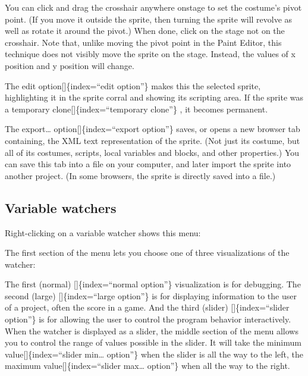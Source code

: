\documentclass[
  letterpaper,
]{book}
\begin{document}
You can click and drag the crosshair anywhere onstage to set the
costume's pivot point. (If you move it outside the sprite, then turning
the sprite will revolve as well as rotate it around the pivot.) When
done, click on the stage not on the crosshair. Note that, unlike moving
the pivot point in the Paint Editor, this technique does not visibly
move the sprite on the stage. Instead, the values of x position and y
position will change.

The edit option{[}{]}\{index=``edit option''\} makes this the selected
sprite, highlighting it in the sprite corral and showing its scripting
area. If the sprite was a temporary clone{[}{]}\{index=``temporary
clone''\} , it becomes permanent.

The export\ldots{} option{[}{]}\{index=``export option''\} saves, or
opens a new browser tab containing, the XML text representation of the
sprite. (Not just its costume, but all of its costumes, scripts, local
variables and blocks, and other properties.) You can save this tab into
a file on your computer, and later import the sprite into another
project. (In some browsers, the sprite is directly saved into a file.)

\subsection{Variable watchers}\label{variable-watchers}

Right-clicking on a variable watcher shows this menu:

The first section of the menu lets you choose one of three
visualizations of the watcher:

The first (normal) {[}{]}\{index=``normal option''\} visualization is
for debugging. The second (large) {[}{]}\{index=``large option''\} is
for displaying information to the user of a project, often the score in
a game. And the third (slider) {[}{]}\{index=``slider option''\} is for
allowing the user to control the program behavior interactively. When
the watcher is displayed as a slider, the middle section of the menu
allows you to control the range of values possible in the slider. It
will take the minimum value{[}{]}\{index=``slider min\ldots{} option''\}
when the slider is all the way to the left, the maximum
value{[}{]}\{index=``slider max\ldots{} option''\} when all the way to
the right.
\end{document}
